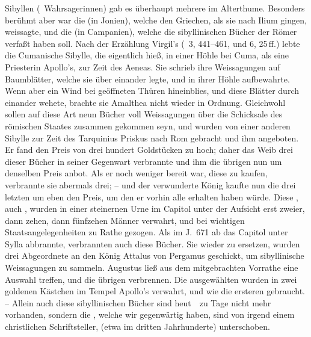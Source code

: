 \begin{aufza}
\item Sibyllen (\dh\ Wahrsagerinnen) gab es überhaupt mehrere im Alterthume. Besonders berühmt aber war die  (in Jonien), welche den Griechen, als sie nach Ilium gingen, weissagte, und die  (in Campanien), welche die sibyllinischen Bücher der Römer verfaßt haben soll. Nach der Erzählung Virgil's (\ 3, 441--461, und 6, 25\,ff.) lebte die Cumanische Sibylle, die eigentlich  hieß, in einer Höhle bei Cuma, als eine Priesterin Apollo's, zur Zeit des Aeneas. Sie schrieb ihre Weissagungen auf Baumblätter, welche sie über einander legte, und in ihrer Höhle aufbewahrte. Wenn aber ein Wind bei geöffneten Thüren hineinblies, und diese Blätter durch einander wehete, brachte sie Amalthea nicht wieder in Ordnung. Gleichwohl sollen auf diese Art neun Bücher voll Weissagungen über die Schicksale des römischen Staates zusammen gekommen seyn, und wurden von einer anderen Sibylle zur Zeit des Tarquinius Priskus nach Rom gebracht und ihm angeboten. Er fand den Preis von drei hundert Goldstücken zu hoch; daher das Weib drei dieser Bücher in seiner Gegenwart verbrannte und ihm die übrigen nun um denselben Preis anbot. Als er noch weniger bereit war, diese zu kaufen, verbrannte sie abermals drei; -- und der verwunderte König kaufte nun die drei letzten um eben den Preis, um den er vorhin alle erhalten haben würde. Diese , auch , wurden in einer steinernen Urne im Capitol unter der Aufsicht erst zweier, dann zehen, dann fünfzehen Männer verwahrt, und bei wichtigen Staatsangelegenheiten zu Rathe gezogen. Als im J.~671 ab  das Capitol unter Sylla abbrannte, verbrannten auch diese Bücher. Sie wieder zu ersetzen, wurden drei Abgeordnete an den König Attalus von Pergamus geschickt, um sibyllinische Weissagungen zu sammeln. Augustus ließ aus dem mitgebrachten Vorrathe eine Auswahl treffen, und die übrigen verbrennen. Die ausgewählten wurden in zwei goldenen Kästchen im Tempel Apollo's verwahrt, und wie die ersteren gebraucht. -- Allein auch diese sibyllinischen Bücher sind heut~\ zu Tage nicht mehr vorhanden, sondern die , welche wir gegenwärtig haben, sind von irgend einem christlichen Schriftsteller, (etwa im dritten Jahrhunderte) unterschoben.

\end{aufza}
